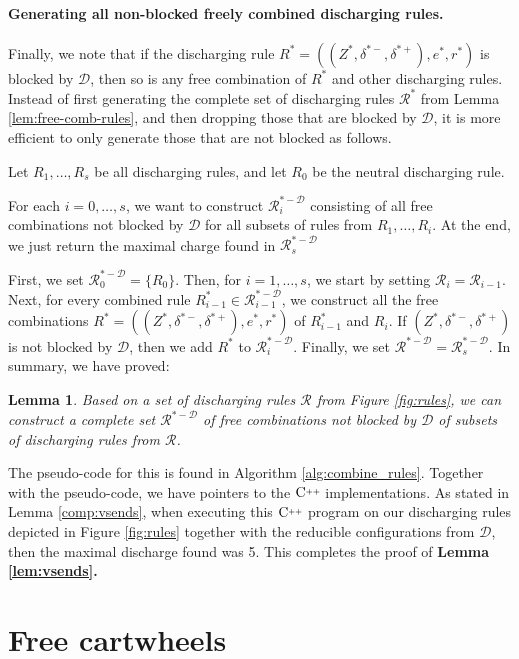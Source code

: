 \documentclass[10pt,a4paper]{article}
\newtheorem{lem}[thm]{Lemma}
\def\Cpp{\textnormal C\raisebox{0.5ex}{\tiny++}}
\newcommand{\mikkel}[1]{\textbf{\textcolor{red}{{M: } #1}}}
\def\cR{{\mathcal R}}
\def\cD{{\mathcal D}}
\def\showlabel#1{}
\begin{document}
\paragraph{Generating all non-blocked freely combined discharging rules.}
Finally, we note that if the discharging rule $R^*=((Z^*,\delta^{*-},\delta^{*+}),e^*,r^*)$
is blocked by $\cD$, then so is any free
combination of $R^*$ and other discharging rules. Instead of first generating the complete set of discharging rules $\cR^*$ from Lemma \ref{lem:free-comb-rules}, and then dropping those that are blocked by $\cD$, it is more efficient to only
generate those that are not blocked as follows.

Let $R_1,\ldots,R_s$ be all discharging rules, and let $R_0$ be the neutral discharging rule. 

For each $i=0,\ldots,s$, we want 
to construct $\cR^{*-\cD}_i$ consisting of all free combinations not blocked by $\cD$ for all subsets of rules from $R_1,\ldots,R_i$. At the end, we just return the maximal charge found in 
$\cR^{*-\cD}_s$

First, we set $\cR^{*-\cD}_0=\{R_0\}$.
Then, for $i=1,\ldots,s$,
we start by setting $\cR_i=\cR_{i-1}$. Next,
for every combined rule
$R^*_{i-1}\in \cR^{*-\cD}_{i-1}$, 
we construct all the free combinations $R^*=((Z^*,\delta^{*-},\delta^{*+}),e^*,r^*)$
of $R^*_{i-1}$ and $R_i$.
If $(Z^*,\delta^{*-},\delta^{*+})$ is not blocked by $\cD$,
then we add $R^*$ to
$\cR^{*-\cD}_i$. Finally, we set $\cR^{*-\cD}=\cR^{*-\cD}_s$.
In summary, we have proved:
\begin{lem}\label{lem:free-comb-rules-noD}
Based on a set of discharging rules 
$\cR$ from Figure \ref{fig:rules}, we can construct a
complete set $\cR^{*-\cD}$ of free combinations not blocked by $\cD$ of subsets of discharging rules from $\cR$.
\end{lem}
The pseudo-code for this is found in Algorithm \ref{alg:combine_rules}. Together with the pseudo-code, we have pointers to the $\Cpp$ implementations. As stated in Lemma \ref{comp:vsends}, 
when executing this $\Cpp$ program on our discharging rules depicted in Figure \ref{fig:rules} together with the reducible configurations from $\cD$, then the maximal discharge found was 5. 
This completes the proof of {\bf Lemma \ref{lem:vsends}.}


\section{Free cartwheels}
\label{sect:free-cartwheel}
\showlabel{sect:free-cartwheel}
 
\end{document}
